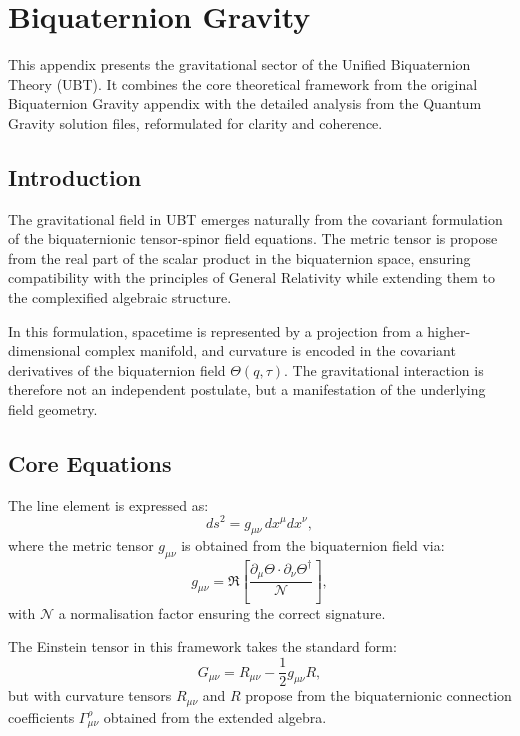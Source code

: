
\section{Biquaternion Gravity}

This appendix presents the gravitational sector of the Unified Biquaternion Theory (UBT).
It combines the core theoretical framework from the original Biquaternion Gravity appendix
with the detailed analysis from the Quantum Gravity solution files, reformulated for
clarity and coherence.

\subsection{Introduction}

The gravitational field in UBT emerges naturally from the covariant formulation of the
biquaternionic tensor-spinor field equations. The metric tensor is propose from the real
part of the scalar product in the biquaternion space, ensuring compatibility with the
principles of General Relativity while extending them to the complexified algebraic
structure.

In this formulation, spacetime is represented by a projection from a higher-dimensional
complex manifold, and curvature is encoded in the covariant derivatives of the
biquaternion field $\Theta(q,\tau)$. The gravitational interaction is therefore not an
independent postulate, but a manifestation of the underlying field geometry.

\subsection{Core Equations}

The line element is expressed as:
\begin{equation}
  ds^2 = g_{\mu\nu} \, dx^\mu dx^\nu ,
\end{equation}
where the metric tensor $g_{\mu\nu}$ is obtained from the biquaternion field via:
\begin{equation}
  g_{\mu\nu} = \Re\left[ \frac{\partial_\mu \Theta \cdot \partial_\nu \Theta^\dagger}{\mathcal{N}} \right],
\end{equation}
with $\mathcal{N}$ a normalisation factor ensuring the correct signature.

The Einstein tensor in this framework takes the standard form:
\begin{equation}
  G_{\mu\nu} = R_{\mu\nu} - \frac{1}{2} g_{\mu\nu} R ,
\end{equation}
but with curvature tensors $R_{\mu\nu}$ and $R$ propose from the biquaternionic connection
coefficients $\Gamma^\rho_{\mu\nu}$ obtained from the extended algebra.

